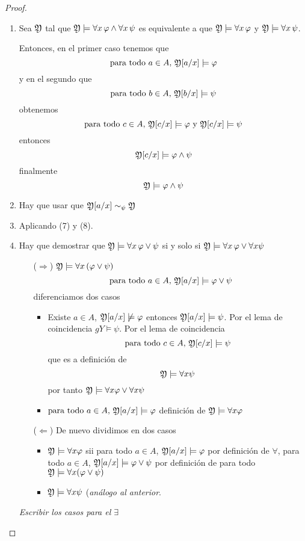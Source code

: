 \begin{proof}
\begin{enumerate}
    \item Sea $\mathfrak{Y}$ tal que $\mathfrak{Y} \models \forall x \, \varphi \wedge \forall x \, \psi$ es equivalente a que $\mathfrak{Y} \models \forall x \, \varphi $ y $\mathfrak{Y} \models \forall x \, \psi$. 
    
    Entonces, en el primer caso tenemos que 
\[ \mbox{para todo } a \in A, \, \mathfrak{Y}[a/x] \models \varphi \]    
     y en el segundo que 
\[ \mbox{para todo } b \in A, \, \mathfrak{Y}[b/x] \models \psi \]     
     obtenemos 
\[ \mbox{para todo } c \in A, \, \mathfrak{Y}[c/x] \models \varphi \mbox{ y } \mathfrak{Y}[c/x] \models \psi \]     
  entonces 
\[ \mathfrak{Y}[c/x] \models \varphi \wedge \psi \]  
finalmente
\[ \mathfrak{Y} \models \varphi \wedge \psi \]
    \item Hay que usar que $\mathfrak{Y}[a/x] \sim_{\psi} \mathfrak{Y}$
 	\item Aplicando (7) y (8).
    \item  
    Hay que demostrar que $\mathfrak{Y} \models \forall x\, \varphi \lor \psi$ si y solo si $\mathfrak{Y}\models\forall x\,\varphi\lor\forall x\psi$ 
    \begin{itemize}
    	\item[($\Rightarrow$)] $\mathfrak{Y}\models\forall x\,(\varphi\lor\psi)$ 
    	\[ \mbox{para todo } a\in A, \, \mathfrak{Y}[a/x]\models\varphi\lor\psi \]
    	diferenciamos dos casos 
    	\begin{itemize}
    		\item Existe $a \in A$, $\mathfrak{Y}[a/x] \not \models \varphi$ entonces $\mathfrak{Y}[a/x]\models\psi$. Por el lema de coincidencia $g{Y} \models \psi$. Por el lema de coincidencia 
    		\[ \mbox{para todo } c \in A, \, \mathfrak{Y}[c/x] \models \psi \]
    		que es a definición de \[ \mathfrak{Y} \models \forall x \psi \]
    		por tanto $ \mathfrak{Y} \models \forall x \varphi \lor \forall x \psi $
    		
    		\item $ \mbox{para todo } a \in A, \, \mathfrak{Y}[a/x] \models \varphi $ definición de $\mathfrak{Y} \models \forall x \varphi$ 
    	\end{itemize}
    	\item[($\Leftarrow$)] De nuevo dividimos en dos casos 
    	\begin{itemize}
    		\item $\mathfrak{Y}\models\forall x \varphi$ sii para todo $a\in A$, $\mathfrak{Y}[a/x]\models\varphi$ por definición de $\forall$, para todo $a\in A$, $\mathfrak{Y}[a/x]\models\varphi\lor\psi$ por definición de para todo $\mathfrak{Y}\models\forall x (\varphi\lor\psi)$
    		\item $\mathfrak{Y}\models\forall x \psi$ (\textit{análogo al anterior}.
    	\end{itemize}
    \end{itemize}
     \textit{Escribir los casos para el $\exists$}
\end{enumerate}
\end{proof}

